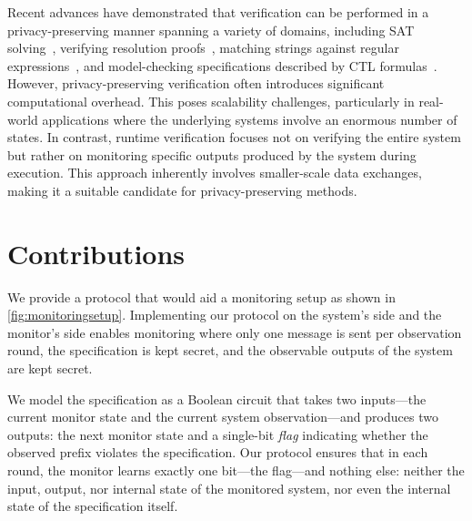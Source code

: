Recent advances have demonstrated that verification can be performed in a privacy-preserving manner spanning a variety of domains, including SAT solving~\cite{LJAPW22}, verifying resolution proofs~\cite{LAHPTW22}, matching strings against regular expressions~\cite{LWSTRP24}, and model-checking specifications described by CTL formulas~\cite{JLAP20}.
However, privacy-preserving verification often introduces significant computational overhead. This poses scalability challenges, particularly in real-world applications where the underlying systems involve an enormous number of states.
In contrast, runtime verification focuses not on verifying the entire system but rather on monitoring specific outputs produced by the system during execution. This approach inherently involves smaller-scale data exchanges, making it a suitable candidate for privacy-preserving methods.

\section{Contributions}

We provide a protocol that would aid a monitoring setup as shown in \cref{fig:monitoringsetup}. Implementing our protocol on the system's side and the monitor's side enables monitoring where only one message is sent per observation round, the specification is kept secret, and the observable outputs of the system are kept secret.

We model the specification as a Boolean circuit that takes two inputs---the current monitor state and the current system observation---and produces two outputs: the next monitor state and a single-bit \emph{flag} indicating whether the observed prefix violates the specification.
Our protocol ensures that in each round, the monitor learns exactly one bit---the flag---and nothing else: neither the input, output, nor internal state of the monitored system, nor even the internal state of the specification itself.

